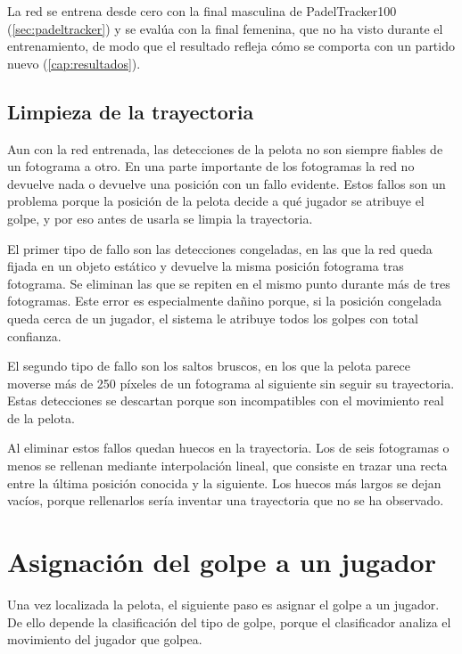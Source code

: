 La red se entrena desde cero con la final masculina de PadelTracker100 (\cref{sec:padeltracker}) y se evalúa con la final femenina, que no ha visto durante el entrenamiento, de modo que el resultado refleja cómo se comporta con un partido nuevo (\cref{cap:resultados}).

\subsection{Limpieza de la trayectoria}
\label{sec:limpieza-pelota}

Aun con la red entrenada, las detecciones de la pelota no son siempre fiables de un fotograma a otro.
En una parte importante de los fotogramas la red no devuelve nada o devuelve una posición con un fallo evidente.
Estos fallos son un problema porque la posición de la pelota decide a qué jugador se atribuye el golpe, y por eso antes de usarla se limpia la trayectoria.

El primer tipo de fallo son las detecciones congeladas, en las que la red queda fijada en un objeto estático y devuelve la misma posición fotograma tras fotograma.
Se eliminan las que se repiten en el mismo punto durante más de tres fotogramas.
Este error es especialmente dañino porque, si la posición congelada queda cerca de un jugador, el sistema le atribuye todos los golpes con total confianza.

El segundo tipo de fallo son los saltos bruscos, en los que la pelota parece moverse más de 250 píxeles de un fotograma al siguiente sin seguir su trayectoria.
Estas detecciones se descartan porque son incompatibles con el movimiento real de la pelota.

Al eliminar estos fallos quedan huecos en la trayectoria.
Los de seis fotogramas o menos se rellenan mediante interpolación lineal, que consiste en trazar una recta entre la última posición conocida y la siguiente.
Los huecos más largos se dejan vacíos, porque rellenarlos sería inventar una trayectoria que no se ha observado.

\section{Asignación del golpe a un jugador}
\label{sec:asignacion}

Una vez localizada la pelota, el siguiente paso es asignar el golpe a un jugador.
De ello depende la clasificación del tipo de golpe, porque el clasificador analiza el movimiento del jugador que golpea.

